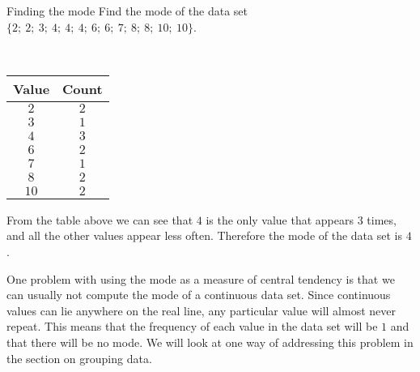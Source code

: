\begin{wex}{Finding the mode}
{Find the mode of the data set $\{2;\ 2;\ 3;\ 4;\ 4;\ 4;\ 6;\ 6;\ 7;\ 8;\ 8;\ 10;\ 10\}$.}
{
\\
  \begin{center}
    \begin{tabular}{|c|c|} \hline
      \textbf{Value} & \textbf{Count} \\ \hline

      $2$ & $2$ \\ \hline
      $3$ & $1$ \\\hline 
      $4$ & $3$ \\\hline
      $6$ & $2$ \\\hline
      $7$ & $1$ \\\hline
      $8$ & $2$ \\\hline
      $10$ & $2$ \\\hline

    \end{tabular}
  \end{center}


  From the table above we can see that $4$ is the only value that
  appears $3$ times, and all the other values appear less
  often. Therefore the mode of the data set is $4$.
}
\end{wex}

One problem with using the mode as a measure of central tendency is
that we can usually not compute the mode of a continuous data
set. Since continuous values can lie anywhere on the real line, any
particular value will almost never repeat. This means that the
frequency of each value in the data set will be $1$ and that there will
be no mode. We will look at one way of addressing this problem in
the section
on grouping data.

